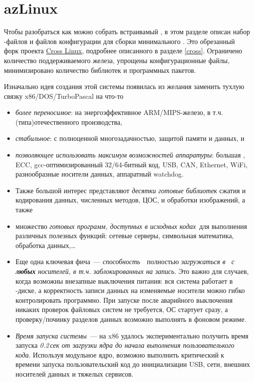 \chapter{azLinux}

Чтобы разобраться как можно собрать встраивамый \linux, в этом разделе описан
набор \make-файлов и файлов конфигурации для сборки минимального \emlinux.
Это обрезанный форк проекта \href{https://github.com/user/cross}{Cross
Linux}, подробнее описанного в разделе \ref{cross}. Ограничено количество
поддерживаемого железа, упрощены конфигурационные файлы, минимизировано
количество библиотек и программных пакетов.

\bigskip 

Изначально идея создания этой системы появилась из желания заменить тухлую
связку x86/DOS/Tur\-bo\-Pas\-cal на что-то

\begin{itemize}
  \item \emph{более переносимое}: на
 энергоэффективное ARM/MIPS-железо, в т.ч. (типа)отечественного производства,
\item \emph{стабильное}: с полноценной многозадачностью,
защитой памяти и данных, и
\item \emph{позволяющее использовать максимум возможностей аппаратуры}: большая
\ram, ECC, gcc-оп\-ти\-ми\-зи\-ро\-ван\-ный 32/64-битный код, USB, CAN, Ethernet,
WiFi, разнообразные носители данных, аппаратный watchdog.

\item Также большой интерес представляют \emph{десятки готовые библиотек} сжатия
и кодирования данных, численных методов, ЦОС, и обработки изображений, а также

\item множество \emph{готовых программ, доступных в исходных кодах}\ для выполнения различных полезных функций: сетевые серверы,
символьная математика, обработка данных,\ldots

\item Еще одна ключевая фича\ --- \emph{способность}\ \linux\ полностью
\emph{загружаться в \ram\ с \textbf{любых} носителей, в т.ч. заблокированных на
запись}. Это важно для случаев, когда возможны внезапные выключения питания:
вся система работает в \ram-диске, а корректность записи данных на изменяемые
носители можно гибко контролировать программно. При запуске после аварийного
выключения никаких проверок файловых систем не требуется, ОС стартует сразу, а
проверку/починку разделов данных возможно выполнять в фоновом режиме.

\item \emph{Время запуска системы}\ --- на x86 удалось экспериментально получить
время запуска \emph{0.2\,сек от загрузки ядра до начала выполнения
пользователького кода}.
Используя модульное ядро, возможно выполнить критический к времени запуска
пользовательский код до инициализации USB, сети, внешних носителей данных и
тяжелых сервисов.

\end{itemize}

